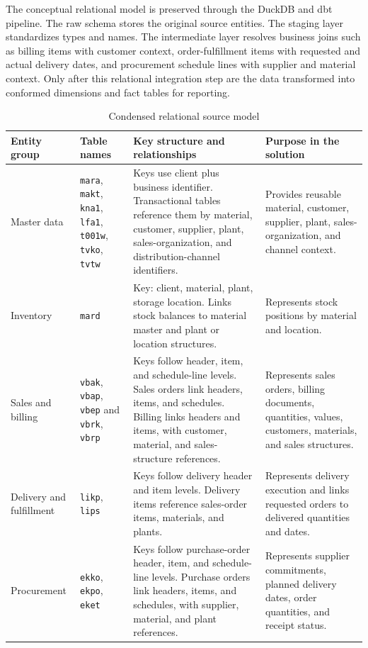 The conceptual relational model is preserved through the DuckDB and \ac{dbt} pipeline. The raw schema stores the original source entities. The staging layer standardizes types and names. The intermediate layer resolves business joins such as billing items with customer context, order-fulfillment items with requested and actual delivery dates, and procurement schedule lines with supplier and material context. Only after this relational integration step are the data transformed into conformed dimensions and fact tables for reporting.

\begin{table}[htbp!]
\centering
\small
\begin{tabular}{p{} p{} p{} p{}}
\hline
\textbf{Entity group} & \textbf{Table names} & \textbf{Key structure and relationships} & \textbf{Purpose in the solution} \\
\hline
Master data & \texttt{mara}, \texttt{makt}, \texttt{kna1}, \texttt{lfa1}, \texttt{t001w}, \texttt{tvko}, \texttt{tvtw} & Keys use client plus business identifier. Transactional tables reference them by material, customer, supplier, plant, sales-organization, and distribution-channel identifiers. & Provides reusable material, customer, supplier, plant, sales-organization, and channel context. \\
Inventory & \texttt{mard} & Key: client, material, plant, storage location. Links stock balances to material master and plant or location structures. & Represents stock positions by material and location. \\
Sales and billing & \texttt{vbak}, \texttt{vbap}, \texttt{vbep} and \texttt{vbrk}, \texttt{vbrp} & Keys follow header, item, and schedule-line levels. Sales orders link headers, items, and schedules. Billing links headers and items, with customer, material, and sales-structure references. & Represents sales orders, billing documents, quantities, values, customers, materials, and sales structures. \\
Delivery and fulfillment & \texttt{likp}, \texttt{lips} & Keys follow delivery header and item levels. Delivery items reference sales-order items, materials, and plants. & Represents delivery execution and links requested orders to delivered quantities and dates. \\
Procurement & \texttt{ekko}, \texttt{ekpo}, \texttt{eket} & Keys follow purchase-order header, item, and schedule-line levels. Purchase orders link headers, items, and schedules, with supplier, material, and plant references. & Represents supplier commitments, planned delivery dates, order quantities, and receipt status. \\
\hline
\end{tabular}
\caption{Condensed relational source model}
\label{tab:relational-source-model-condensed}
\normalsize
\end{table}

